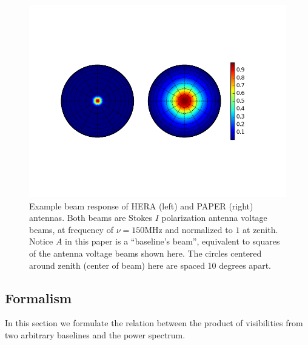 \documentclass[twocolumn,apj,numberedappendix]{emulateapj}
\renewcommand\[{\begin{equation}}
\renewcommand\]{\end{equation}}
\begin{document}
\begin{figure}[H]
\includegraphics[width=1.2\linewidth]{Beams}

\caption{Example beam response of HERA (left) and PAPER (right) antennas. Both beams are Stokes $I$ polarization antenna voltage beams, at frequency of $\nu=150\text{MHz}$ and normalized to $1$ at zenith. Notice $A$ in this paper is a ``baseline's beam'', equivalent to squares of the antenna voltage beams shown here. The circles centered around zenith (center of beam) here are
spaced 10 degrees apart. \label{fig:Beam}}
\end{figure}



\subsection{Formalism}
In this section we formulate the relation between 
the product of visibilities from two arbitrary baselines and the power spectrum. 
\end{document}
